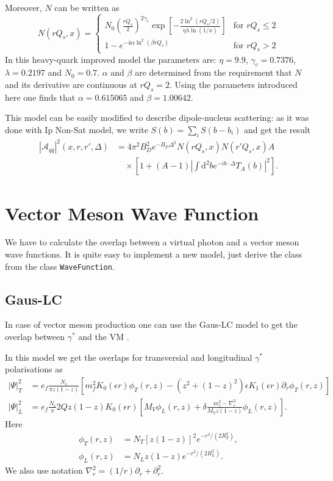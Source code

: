 \documentclass[a4paper,12pt]{article}
\newcommand{\code}[1]{\texttt{#1}}
\newcommand{\der}{\mathrm{d}}
\newcommand{\A}{\mathcal{A}}
\begin{document}
Moreover, $N$ can be written as
\begin{equation}
N(rQ_s,x) = \begin{cases}
	N_0\left( \frac{rQ_s}{2} \right)^{2\gamma_c} \exp \left[ -\frac{2 \ln^2 (rQ_s/2) }{\eta \lambda \ln (1/x)} \right] & \text{for } rQ_s \leq 2  \\
	1-e^{-4\alpha \ln^2 (\beta rQ_s)} & \text{for } rQ_s > 2	
	\end{cases}
\end{equation}
In this heavy-quark improved model the parameters are: $\eta = 9.9$, $\gamma_c = 0.7376$, $\lambda=0.2197$ and $N_0 = 0.7$. $\alpha$ and $\beta$ are determined from the requirement that $N$ and its derivative are continuous at $rQ_s=2$. Using the parameters introduced here one finds that $\alpha = 0.615065$ and $\beta = 1.00642$.

This model can be easily modified to describe dipole-nucleus scattering: as it was done with Ip Non-Sat model, we write $S(b) = \sum_i S(b-b_i)$ and get the result
\begin{equation}
\begin{split}
	|\A_{q\bar q}|^2(x,r,r',\Delta) &= 4\pi^2B_D^2 e^{-B_D \Delta^2} N(rQ_s,x)N(r'Q_s,x) A \\
	&\quad \times \left[1 + (A-1) \left| \int \der^2 b e^{-ib \cdot \Delta} T_A(b) \right|^2 \right] . 
\end{split}
\end{equation}

\section{Vector Meson Wave Function}
We have to calculate the overlap between a virtual photon and a vector meson wave functions. It is quite easy to implement a new model, just derive the class from the class \code{WaveFunction}.

\subsection{Gaus-LC}
In case of vector meson production one can use the Gaus-LC model to get the overlap between $\gamma^*$ and the VM \cite{Kowalski:2006hc}.

In this model we get the overlaps for transversial and longitudinal $\gamma^*$ polarisations as
\begin{align}
	|\Psi |^2_T &= e_f \frac{N_c}{\pi z(1-z)} \left[ m_f^2 K_0(\epsilon r)\phi_T(r,z) - (z^2 + (1-z)^2) \epsilon K_1(\epsilon r) \partial_r \phi_T(r,z) \right] \\
	|\Psi |^2_L &= e_f \frac{N_c}{\pi} 2Q z (1-z)K_0(\epsilon r) \left[ M_V \phi_L(r,z) + \delta \frac{m_f^2 - \nabla_r^2}{M_V z(1-z)}\phi_L(r,z) \right].
\end{align}
Here
\begin{align}
	\phi_T(r,z) &= N_T \left[ z(1-z)\right]^2 e^{-r^2/(2R_T^2)}, \\
	\phi_L(r,z) &= N_L z(1-z) e^{-r^2/(2R_L^2)}.
\end{align}
We also use notation $\nabla_r^2 = (1/r)\partial_r + \partial_r^2$.
\end{document}
